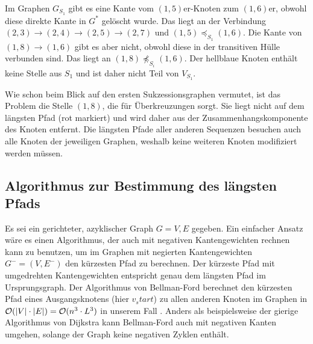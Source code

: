 \begin{center}
\end{center}

\vspace{-5pt}

Im Graphen $G_{S_1}$ gibt es eine Kante vom $(1,5)$er-Knoten zum $(1,6)$er, obwohl diese direkte Kante in $G^{*}$ gelöscht wurde. Das liegt an der Verbindung $(2,3) \rightarrow (2,4) \rightarrow (2,5) \rightarrow (2,7)$ und $(1,5) \preceq_{S_1} (1,6)$. Die Kante von $(1,8) \rightarrow (1,6)$ gibt es aber nicht, obwohl diese in der transitiven Hülle verbunden sind. Das liegt an $(1,8) \npreceq_{S_i} (1,6)$. Der hellblaue Knoten enthält keine Stelle aus $S_1$ und ist daher nicht Teil von $V_{S_1}$.

Wie schon beim Blick auf den ersten Sukzessionsgraphen vermutet, ist das Problem die Stelle $(1,8)$, die für Überkreuzungen sorgt. Sie liegt nicht auf dem längsten Pfad (rot markiert) und wird daher aus der Zusammenhangskomponente des Knoten entfernt. Die längsten Pfade aller anderen Sequenzen besuchen auch alle Knoten der jeweiligen Graphen, weshalb keine weiteren Knoten modifiziert werden müssen.

\subsection{Algorithmus zur Bestimmung des längsten Pfads}

Es sei ein gerichteter, azyklischer Graph $G = V,E$ gegeben. Ein einfacher Ansatz wäre es einen Algorithmus, der auch mit negativen Kantengewichten rechnen kann zu benutzen, um im Graphen mit negierten Kantengewichten $G^{-} = (V,E^{-})$ den kürzesten Pfad zu berechnen. Der kürzeste Pfad mit umgedrehten Kantengewichten entspricht genau dem längsten Pfad im Ursprungsgraph. Der Algorithmus von Bellman-Ford berechnet den kürzesten Pfad eines Ausgangsknotens (hier $v_start$) zu allen anderen Knoten im Graphen in $\mathcal{O}(|V|\cdot |E|) = \mathcal{O}(n^3\cdot L^3)$ in unserem Fall \cite{clrs09}. Anders als beispielsweise der gierige Algorithmus von Dijkstra kann Bellman-Ford auch mit negativen Kanten umgehen, solange der Graph keine negativen Zyklen enthält. 

